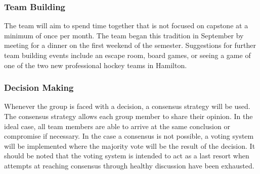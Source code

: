 \documentclass{article}
\begin{document}
\subsubsection*{Team Building}

The team will aim to spend time together that is not focused on capstone at a minimum of once per month. The team began this tradition in September by meeting for a dinner on the first weekend of the semester.
Suggestions for further team building events include an escape room, board games, or seeing a game of one of the two new professional hockey teams in Hamilton.

\subsubsection*{Decision Making} 

Whenever the group is faced with a decision, a consensus strategy will be used. The consensus strategy allows each group member to share their opinion. 
In the ideal case, all team members are able to arrive at the same conclusion or compromise if necessary. In the case a consensus is not possible, a voting system will be implemented 
where the majority vote will be the result of the decision. It should be noted that the voting system is intended to act as a last resort when attempts at reaching 
consensus through healthy discussion have been exhausted.
\end{document}
